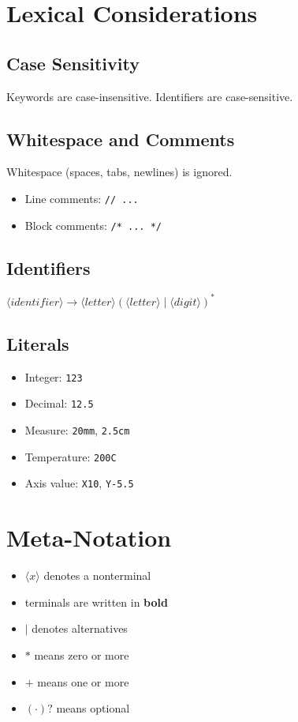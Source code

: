 \section{Lexical Considerations}

\subsection{Case Sensitivity}
Keywords are case-insensitive. Identifiers are case-sensitive.

\subsection{Whitespace and Comments}
Whitespace (spaces, tabs, newlines) is ignored.

\begin{itemize}
    \item Line comments: \texttt{// ...}
    \item Block comments: \texttt{/* ... */}
\end{itemize}

\subsection{Identifiers}
\(
\langle identifier \rangle \rightarrow \langle letter \rangle (\langle letter \rangle \mid \langle digit \rangle)^*
\)

\subsection{Literals}
\begin{itemize}
    \item Integer: \texttt{123}
    \item Decimal: \texttt{12.5}
    \item Measure: \texttt{20mm}, \texttt{2.5cm}
    \item Temperature: \texttt{200C}
    \item Axis value: \texttt{X10}, \texttt{Y-5.5}
\end{itemize}

\section{Meta-Notation}

\begin{itemize}
    \item $\langle x \rangle$ denotes a nonterminal
    \item terminals are written in \textbf{bold}
    \item $|$ denotes alternatives
    \item $*$ means zero or more
    \item $+$ means one or more
    \item $(\cdot)?$ means optional
\end{itemize}

